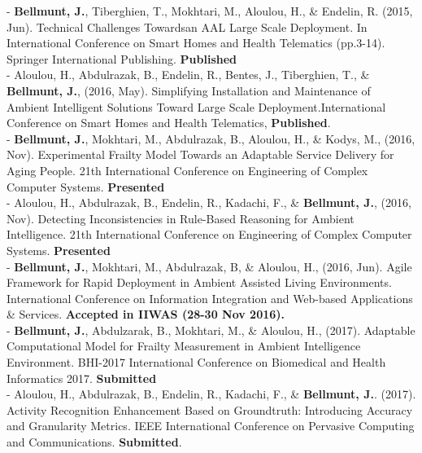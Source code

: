 \documentclass[paper=a4,fontsize=11pt]{temp} %
\begin{document}
%
\pagebreak
\sepspace

\hspace{3mm}
\begin{minipage}{0.04\linewidth}
        \hspace{\linewidth}
		\end{minipage}%
   \begin{minipage}{0.88\linewidth}
    
    - \textbf{Bellmunt, J.}, Tiberghien, T., Mokhtari, M., Aloulou, H., \& Endelin, R. (2015, Jun). Technical Challenges Towardsan AAL Large Scale Deployment. In International Conference on Smart Homes and Health Telematics (pp.3-14). Springer International Publishing. \textbf{Published}\\
    
    - Aloulou, H., Abdulrazak, B., Endelin, R., Bentes, J., Tiberghien, T., \& \textbf{Bellmunt, J.}, (2016, May). Simplifying Installation and Maintenance of Ambient Intelligent Solutions Toward Large Scale Deployment.International Conference on Smart Homes and Health Telematics, \textbf{Published}.\\
    
   - \textbf{Bellmunt, J.}, Mokhtari, M., Abdulrazak, B., Aloulou, H., \& Kodys, M., (2016, Nov). Experimental Frailty Model Towards an Adaptable Service Delivery for Aging People. 21th International Conference on Engineering of Complex Computer Systems. \textbf{Presented}\\
   
    - Aloulou, H., Abdulrazak, B., Endelin, R., Kadachi, F., \& \textbf{Bellmunt, J.}, (2016, Nov). Detecting Inconsistencies in Rule-Based Reasoning for Ambient Intelligence. 21th International Conference on Engineering of Complex Computer Systems. \textbf{Presented}\\
    
    - \textbf{Bellmunt, J.}, Mokhtari, M., Abdulrazak, B, \& Aloulou, H., (2016, Jun). Agile Framework for Rapid Deployment in Ambient Assisted Living Environments. International Conference on Information Integration and Web-based Applications \& Services. \textbf{Accepted in IIWAS (28-30 Nov 2016).}\\
    
    - \textbf{Bellmunt, J.}, Abdulzarak, B., Mokhtari, M., \& Aloulou, H., (2017). Adaptable Computational Model for Frailty Measurement in Ambient Intelligence Environment. BHI-2017 International Conference on Biomedical and Health Informatics 2017. \textbf{Submitted}\\
    
    - Aloulou, H., Abdulrazak, B., Endelin, R., Kadachi, F., \& \textbf{Bellmunt, J.}. (2017). Activity Recognition Enhancement Based on Groundtruth: Introducing Accuracy and Granularity Metrics. IEEE
International Conference on Pervasive Computing and Communications. \textbf{Submitted}.\\

   \end{minipage}        
\sepspace
\end{document}
